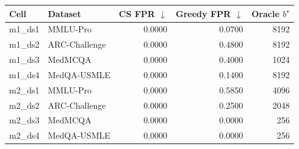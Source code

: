 \documentclass[a4paper,fleqn]{cas-sc}
\theoremstyle{plain}
\theoremstyle{definition}
\theoremstyle{remark}
\begin{document}
\begin{center}
\begin{minipage}{0.88\textwidth}
\centering

\captionsetup{
  font=small,
  skip=5pt,
  justification=justified,
  singlelinecheck=false
}

\small
\setlength{\tabcolsep}{5.5pt}
\renewcommand{\arraystretch}{0.98}

\begin{tabular}{@{}llrrr@{}}
\toprule
Cell &
Dataset &
CS FPR $\downarrow$ &
Greedy FPR $\downarrow$ &
Oracle $b^\star$ \\
\midrule
m1\_ds1 & MMLU-Pro       & 0.0000 & 0.0700 & 8192 \\
m1\_ds2 & ARC-Challenge  & 0.0000 & 0.4800 & 8192 \\
m1\_ds3 & MedMCQA        & 0.0000 & 0.4000 & 1024 \\
m1\_ds4 & MedQA-USMLE    & 0.0000 & 0.1400 & 8192 \\
m2\_ds1 & MMLU-Pro       & 0.0000 & 0.5850 & 4096 \\
m2\_ds2 & ARC-Challenge  & 0.0000 & 0.2500 & 2048 \\
m2\_ds3 & MedMCQA        & 0.0000 & 0.0000 & 256 \\
m2\_ds4 & MedQA-USMLE    & 0.0000 & 0.0000 & 256 \\
\bottomrule
\end{tabular}

\label{tab:a03_cs_greedy}

\end{minipage}
\end{center}

\vspace{0.65\baselineskip}



\Needspace{0.58\textheight}
\par\medskip
\end{document}
